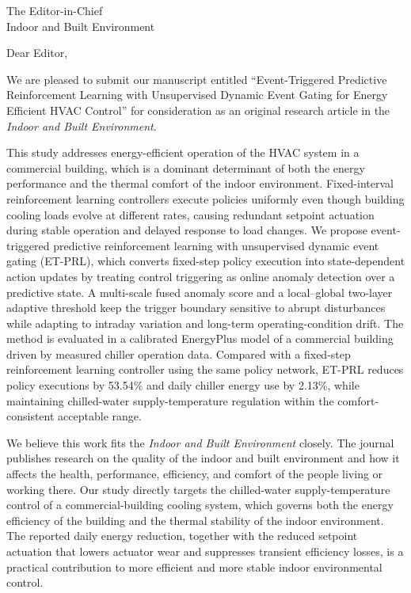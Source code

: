 \documentclass[11pt]{letter}
\begin{document}
\begin{letter}{The Editor-in-Chief\\Indoor and Built Environment}

\opening{Dear Editor,}

We are pleased to submit our manuscript entitled ``Event-Triggered Predictive Reinforcement Learning with Unsupervised Dynamic Event Gating for Energy Efficient HVAC Control'' for consideration as an original research article in the \textit{Indoor and Built Environment}.

This study addresses energy-efficient operation of the HVAC system in a commercial building, which is a dominant determinant of both the energy performance and the thermal comfort of the indoor environment. Fixed-interval reinforcement learning controllers execute policies uniformly even though building cooling loads evolve at different rates, causing redundant setpoint actuation during stable operation and delayed response to load changes. We propose event-triggered predictive reinforcement learning with unsupervised dynamic event gating (ET-PRL), which converts fixed-step policy execution into state-dependent action updates by treating control triggering as online anomaly detection over a predictive state. A multi-scale fused anomaly score and a local--global two-layer adaptive threshold keep the trigger boundary sensitive to abrupt disturbances while adapting to intraday variation and long-term operating-condition drift. The method is evaluated in a calibrated EnergyPlus model of a commercial building driven by measured chiller operation data. Compared with a fixed-step reinforcement learning controller using the same policy network, ET-PRL reduces policy executions by 53.54\% and daily chiller energy use by 2.13\%, while maintaining chilled-water supply-temperature regulation within the comfort-consistent acceptable range.

We believe this work fits the \textit{Indoor and Built Environment} closely. The journal publishes research on the quality of the indoor and built environment and how it affects the health, performance, efficiency, and comfort of the people living or working there. Our study directly targets the chilled-water supply-temperature control of a commercial-building cooling system, which governs both the energy efficiency of the building and the thermal stability of the indoor environment. The reported daily energy reduction, together with the reduced setpoint actuation that lowers actuator wear and suppresses transient efficiency losses, is a practical contribution to more efficient and more stable indoor environmental control.


\end{letter}
\end{document}
